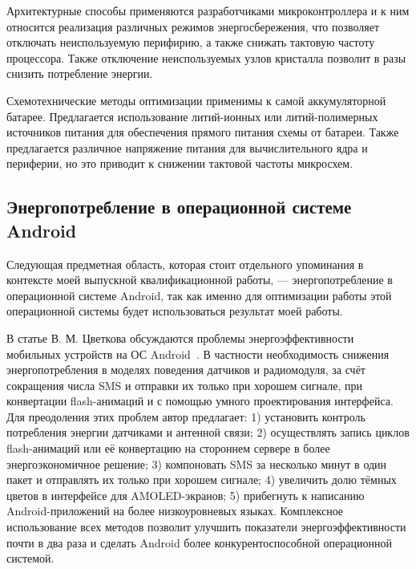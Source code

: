 \documentclass[a4paper,14pt]{extarticle} %
\begin{document}
	Архитектурные способы применяются разработчиками микроконтроллера и к ним относится реализация различных режимов энергосбережения, что позволяет отключать неиспользуемую перифирию, а также снижать тактовую частоту процессора. Также отключение неиспользуемых узлов кристалла позволит в разы снизить потребление энергии.
	
	Схемотехнические методы оптимизации применимы к самой аккумуляторной батарее. Предлагается использование литий-ионных или литий-полимерных источников питания для обеспечения прямого питания схемы от батареи. Также предлагается различное напряжение питания для вычислительного ядра и периферии, но это приводит к снижении тактовой частоты микросхем.
	
	
	\subsection{Энергопотребление в операционной системе Android}

	Следующая предметная область, которая стоит отдельного упоминания в контексте моей выпускной квалификационной работы, --- энергопотребление в операционной системе Android, так как именно для оптимизации работы этой операционной системы будет использоваться результат моей работы.
	
	В статье В. М. Цветкова обсуждаются проблемы энергоэффективности мобильных устройств на ОС Android~\parencite{цветков2014энергоэффективность}. В частности необходимость снижения энергопотребления в моделях поведения датчиков и радиомодуля, за счёт сокращения числа SMS и отправки их только при хорошем сигнале, при конвертации flash-анимаций и с помощью умного проектирования интерфейса. Для преодоления этих проблем автор предлагает: 1) установить контроль потребления энергии датчиками и антенной связи; 2) осуществлять запись циклов flash-анимаций или её конвертацию на стороннем сервере в более энергоэкономичное решение; 3) компоновать SMS за несколько минут в один пакет и отправлять их только при хорошем сигнале; 4) увеличить долю тёмных цветов в интерфейсе для AMOLED-экранов; 5) прибегнуть к написанию Android-приложений на более низкоуровневых языках. Комплексное использование всех методов позволит улучшить показатели энергоэффективности почти в два раза и сделать Android более конкурентоспособной операционной системой.
	
\end{document}
